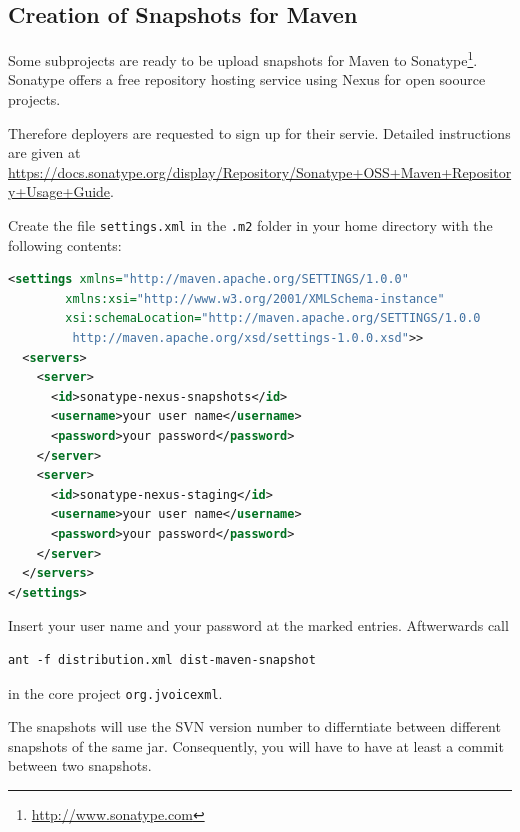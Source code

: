\documentclass[11pt,a4paper]{article}
\begin{document}
\subsection{Creation of Snapshots for Maven}

Some subprojects are ready to be upload snapshots for Maven to
Sonatype\footnote{\url{http://www.sonatype.com}}. Sonatype offers
a free repository hosting service using Nexus for open soource projects.

Therefore deployers are requested to sign up for their servie. Detailed
instructions are given at \url{https://docs.sonatype.org/display/Repository/Sonatype+OSS+Maven+Repository+Usage+Guide}.

Create the file \texttt{settings.xml} in the \texttt{.m2} folder in your
home directory with the following contents:

\begin{lstlisting}[language=XML]
<settings xmlns="http://maven.apache.org/SETTINGS/1.0.0"
        xmlns:xsi="http://www.w3.org/2001/XMLSchema-instance"
        xsi:schemaLocation="http://maven.apache.org/SETTINGS/1.0.0
         http://maven.apache.org/xsd/settings-1.0.0.xsd">>
  <servers>
    <server>
      <id>sonatype-nexus-snapshots</id>
      <username>your user name</username>
      <password>your password</password>
    </server>
    <server>
      <id>sonatype-nexus-staging</id>
      <username>your user name</username>
      <password>your password</password>
    </server>
  </servers>
</settings>
\end{lstlisting}

Insert your user name and your password at the marked entries.
Aftwerwards call 
\begin{lstlisting}
ant -f distribution.xml dist-maven-snapshot
\end{lstlisting}
in the core project \lstinline{org.jvoicexml}.

The snapshots will use the SVN version number to differntiate between different
snapshots of the same jar. Consequently, you will have to have at least
a commit between two snapshots.


\end{document}

